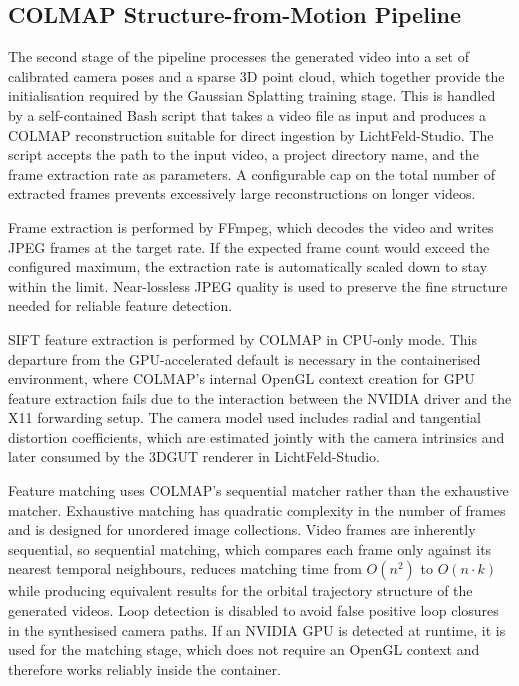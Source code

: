 \documentclass[conference]{IEEEtran}
\begin{document}
\subsection{COLMAP Structure-from-Motion Pipeline}

The second stage of the pipeline processes the generated video into a set of calibrated camera poses and a sparse 3D point cloud, which together provide the initialisation required by the Gaussian Splatting training stage. This is handled by a self-contained Bash script that takes a video file as input and produces a COLMAP reconstruction suitable for direct ingestion by LichtFeld-Studio. The script accepts the path to the input video, a project directory name, and the frame extraction rate as parameters. A configurable cap on the total number of extracted frames prevents excessively large reconstructions on longer videos.

Frame extraction is performed by FFmpeg, which decodes the video and writes JPEG frames at the target rate. If the expected frame count would exceed the configured maximum, the extraction rate is automatically scaled down to stay within the limit. Near-lossless JPEG quality is used to preserve the fine structure needed for reliable feature detection.

SIFT feature extraction is performed by COLMAP in CPU-only mode. This departure from the GPU-accelerated default is necessary in the containerised environment, where COLMAP's internal OpenGL context creation for GPU feature extraction fails due to the interaction between the NVIDIA driver and the X11 forwarding setup. The camera model used includes radial and tangential distortion coefficients, which are estimated jointly with the camera intrinsics and later consumed by the 3DGUT renderer in LichtFeld-Studio.

Feature matching uses COLMAP's sequential matcher rather than the exhaustive matcher. Exhaustive matching has quadratic complexity in the number of frames and is designed for unordered image collections. Video frames are inherently sequential, so sequential matching, which compares each frame only against its nearest temporal neighbours, reduces matching time from $O(n^2)$ to $O(n \cdot k)$ while producing equivalent results for the orbital trajectory structure of the generated videos. Loop detection is disabled to avoid false positive loop closures in the synthesised camera paths. If an NVIDIA GPU is detected at runtime, it is used for the matching stage, which does not require an OpenGL context and therefore works reliably inside the container.
\end{document}
